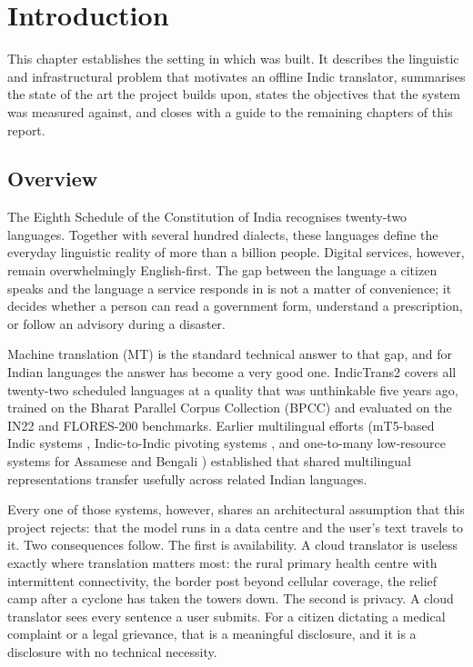 \chapter{Introduction}
\label{ch:introduction}

This chapter establishes the setting in which \setu{} was built. It describes the
linguistic and infrastructural problem that motivates an offline Indic
translator, summarises the state of the art the project builds upon, states the
objectives that the system was measured against, and closes with a guide to the
remaining chapters of this report.

\section{Overview}
\label{sec:overview}

The Eighth Schedule of the Constitution of India recognises twenty-two
languages. Together with several hundred dialects, these languages define the
everyday linguistic reality of more than a billion people. Digital services,
however, remain overwhelmingly English-first. The gap between the language a
citizen speaks and the language a service responds in is not a matter of
convenience; it decides whether a person can read a government form, understand
a prescription, or follow an advisory during a disaster.

Machine translation (MT) is the standard technical answer to that gap, and for
Indian languages the answer has become a very good one. IndicTrans2
\cite{ref:indictrans2} covers all twenty-two scheduled languages at a quality
that was unthinkable five years ago, trained on the Bharat Parallel Corpus
Collection (BPCC) and evaluated on the IN22 and FLORES-200 benchmarks. Earlier
multilingual efforts (mT5-based Indic systems \cite{ref:mt5indic}, Indic-to-Indic
pivoting systems \cite{ref:indic2indic}, and one-to-many low-resource systems for
Assamese and Bengali \cite{ref:assamese}) established that shared multilingual
representations transfer usefully across related Indian languages.

Every one of those systems, however, shares an architectural assumption that
this project rejects: that the model runs in a data centre and the user's text
travels to it. Two consequences follow. The first is availability. A cloud
translator is useless exactly where translation matters most: the rural
primary health centre with intermittent connectivity, the border post beyond
cellular coverage, the relief camp after a cyclone has taken the towers down.
The second is privacy. A cloud translator sees every sentence a user submits.
For a citizen dictating a medical complaint or a legal grievance, that is a
meaningful disclosure, and it is a disclosure with no technical necessity.

